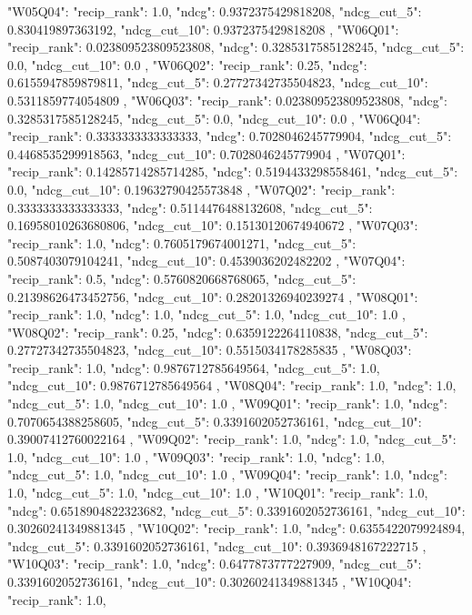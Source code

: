 { "W05Q04": {
  "recip_rank": 1.0,
  "ndcg": 0.9372375429818208,
  "ndcg_cut_5": 0.830419897363192,
  "ndcg_cut_10": 0.9372375429818208
 },
 "W06Q01": {
  "recip_rank": 0.023809523809523808,
  "ndcg": 0.3285317585128245,
  "ndcg_cut_5": 0.0,
  "ndcg_cut_10": 0.0
 },
 "W06Q02": {
  "recip_rank": 0.25,
  "ndcg": 0.6155947859879811,
  "ndcg_cut_5": 0.27727342735504823,
  "ndcg_cut_10": 0.5311859774054809
 },
 "W06Q03": {
  "recip_rank": 0.023809523809523808,
  "ndcg": 0.3285317585128245,
  "ndcg_cut_5": 0.0,
  "ndcg_cut_10": 0.0
 },
 "W06Q04": {
  "recip_rank": 0.3333333333333333,
  "ndcg": 0.7028046245779904,
  "ndcg_cut_5": 0.4468535299918563,
  "ndcg_cut_10": 0.7028046245779904
 },
 "W07Q01": {
  "recip_rank": 0.14285714285714285,
  "ndcg": 0.5194433298558461,
  "ndcg_cut_5": 0.0,
  "ndcg_cut_10": 0.19632790425573848
 },
 "W07Q02": {
  "recip_rank": 0.3333333333333333,
  "ndcg": 0.5114476488132608,
  "ndcg_cut_5": 0.16958010263680806,
  "ndcg_cut_10": 0.15130120674940672
 },
 "W07Q03": {
  "recip_rank": 1.0,
  "ndcg": 0.7605179674001271,
  "ndcg_cut_5": 0.5087403079104241,
  "ndcg_cut_10": 0.4539036202482202
 },
 "W07Q04": {
  "recip_rank": 0.5,
  "ndcg": 0.5760820668768065,
  "ndcg_cut_5": 0.21398626473452756,
  "ndcg_cut_10": 0.28201326940239274
 },
 "W08Q01": {
  "recip_rank": 1.0,
  "ndcg": 1.0,
  "ndcg_cut_5": 1.0,
  "ndcg_cut_10": 1.0
 },
 "W08Q02": {
  "recip_rank": 0.25,
  "ndcg": 0.6359122264110838,
  "ndcg_cut_5": 0.27727342735504823,
  "ndcg_cut_10": 0.5515034178285835
 },
 "W08Q03": {
  "recip_rank": 1.0,
  "ndcg": 0.9876712785649564,
  "ndcg_cut_5": 1.0,
  "ndcg_cut_10": 0.9876712785649564
 },
 "W08Q04": {
  "recip_rank": 1.0,
  "ndcg": 1.0,
  "ndcg_cut_5": 1.0,
  "ndcg_cut_10": 1.0
 },
 "W09Q01": {
  "recip_rank": 1.0,
  "ndcg": 0.7070654388258605,
  "ndcg_cut_5": 0.3391602052736161,
  "ndcg_cut_10": 0.39007412760022164
 },
 "W09Q02": {
  "recip_rank": 1.0,
  "ndcg": 1.0,
  "ndcg_cut_5": 1.0,
  "ndcg_cut_10": 1.0
 },
 "W09Q03": {
  "recip_rank": 1.0,
  "ndcg": 1.0,
  "ndcg_cut_5": 1.0,
  "ndcg_cut_10": 1.0
 },
 "W09Q04": {
  "recip_rank": 1.0,
  "ndcg": 1.0,
  "ndcg_cut_5": 1.0,
  "ndcg_cut_10": 1.0
 },
 "W10Q01": {
  "recip_rank": 1.0,
  "ndcg": 0.6518904822323682,
  "ndcg_cut_5": 0.3391602052736161,
  "ndcg_cut_10": 0.30260241349881345
 },
 "W10Q02": {
  "recip_rank": 1.0,
  "ndcg": 0.6355422079924894,
  "ndcg_cut_5": 0.3391602052736161,
  "ndcg_cut_10": 0.3936948167222715
 },
 "W10Q03": {
  "recip_rank": 1.0,
  "ndcg": 0.6477873777227909,
  "ndcg_cut_5": 0.3391602052736161,
  "ndcg_cut_10": 0.30260241349881345
 },
 "W10Q04": {
  "recip_rank": 1.0,
}}
